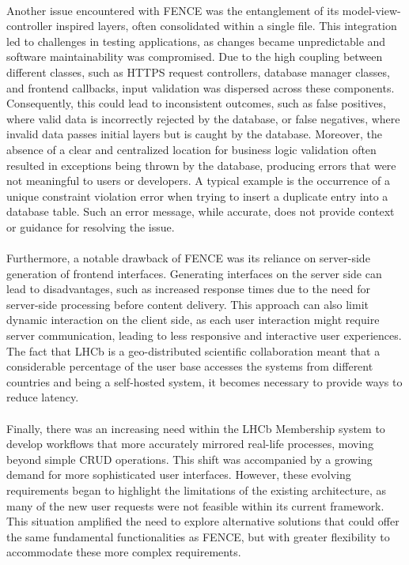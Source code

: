 \paragraph{} Another issue encountered with FENCE was the entanglement of its model-view-controller inspired layers, often consolidated within a single file. This integration led to challenges in testing applications, as changes became unpredictable and software maintainability was compromised. Due to the high coupling between different classes, such as HTTPS request controllers, database manager classes, and frontend callbacks, input validation was dispersed across these components. Consequently, this could lead to inconsistent outcomes, such as false positives, where valid data is incorrectly rejected by the database, or false negatives, where invalid data passes initial layers but is caught by the database. Moreover, the absence of a clear and centralized location for business logic validation often resulted in exceptions being thrown by the database, producing errors that were not meaningful to users or developers. A typical example is the occurrence of a unique constraint violation error when trying to insert a duplicate entry into a database table. Such an error message, while accurate, does not provide context or guidance for resolving the issue.
 

\paragraph{} Furthermore, a notable drawback of FENCE was its reliance on server-side generation of frontend interfaces. Generating interfaces on the server side can lead to disadvantages, such as increased response times due to the need for server-side processing before content delivery. This approach can also limit dynamic interaction on the client side, as each user interaction might require server communication, leading to less responsive and interactive user experiences. The fact that LHCb is a geo-distributed scientific collaboration meant that a considerable percentage of the user base accesses the systems from different countries and being a self-hosted system, it becomes necessary to provide ways to reduce latency.

\paragraph{} Finally, there was an increasing need within the LHCb Membership system to develop workflows that more accurately mirrored real-life processes, moving beyond simple CRUD operations. This shift was accompanied by a growing demand for more sophisticated user interfaces. However, these evolving requirements began to highlight the limitations of the existing architecture, as many of the new user requests were not feasible within its current framework. This situation amplified the need to explore alternative solutions that could offer the same fundamental functionalities as FENCE, but with greater flexibility to accommodate these more complex requirements.






